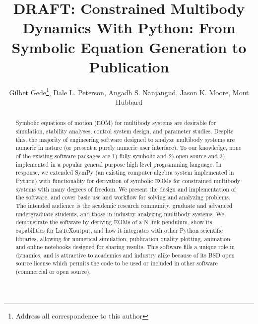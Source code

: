 \documentclass[twocolumn,10pt]{asme2e}
\title{DRAFT: Constrained Multibody Dynamics With Python: From Symbolic
Equation Generation to Publication}
\author{Gilbet Gede\thanks{Address all correspondence to this author}, Dale L.
Peterson, Angadh S. Nanjangud, Jason K. Moore, Mont Hubbard
  \affiliation{
    Sports Biomechanics Laboratory\\
    Department of Mechanical and Aerospace Engineering\\
    University of California\\
    Davis, California 95616\\
    Email: \{ggede, dlpeterson, asnanjangud, jkmoor, mhubbard\}@ucdavis.edu
  }
}
\begin{document}
\maketitle

\begin{abstract}
Symbolic equations of motion (EOM) for multibody systems are desirable for
simulation, stability analyses, control system design, and parameter studies.
Despite this, the majority of engineering software designed to analyze
multibody systems are numeric in nature (or present a purely numeric user
interface). To our knowledge, none of the existing software packages are 1) fully
symbolic and 2) open source and 3) implemented in a popular general purpose
high level programming language.
In response, we extended SymPy (an existing computer algebra system implemented
in Python) with functionality for derivation of symbolic EOMs for constrained
multibody systems with many degrees of freedom.
We present the design and implementation of the software, and cover basic use
and workflow for solving and analyzing problems. The intended audience is the
academic research community, graduate and advanced undergraduate students, and
those in industry analyzing multibody systems.
We demonstrate the software by deriving EOMs of a N link pendulum, show its
capabilities for \LaTeX output, and how it integrates with other Python
scientific libraries, allowing for numerical simulation, publication quality
plotting, animation, and online notebooks designed for sharing results.
This software fills a unique role in dynamics, and is attractive to academics
and industry alike because of its BSD open source license which permits the
code to be used or included in other software (commercial or open source).
\end{abstract}

\end{document}
